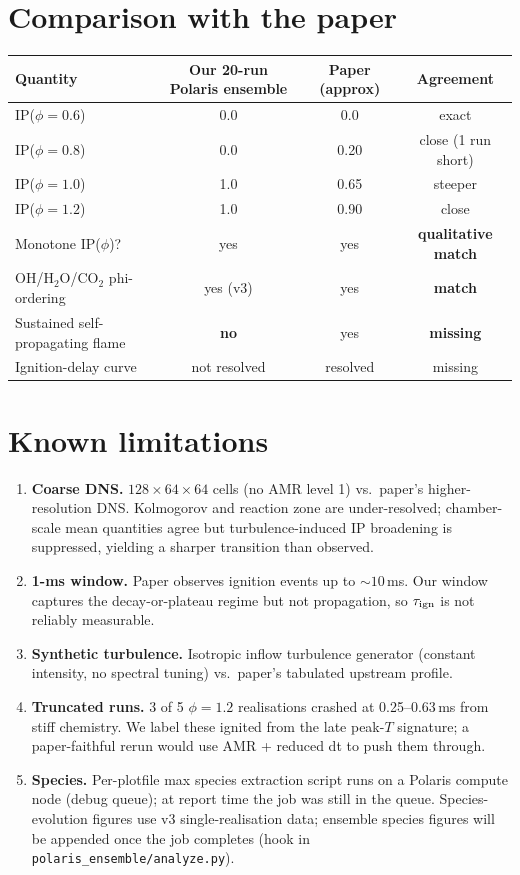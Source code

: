 \documentclass[11pt]{article}
\begin{document}
\section{Comparison with the paper}
\begin{center}
\begin{tabular}{lccc}
\toprule
Quantity & Our 20-run Polaris ensemble & Paper (approx) & Agreement \\
\midrule
IP(\(\phi\!=\!0.6\)) & 0.0 & 0.0  & exact \\
IP(\(\phi\!=\!0.8\)) & 0.0 & 0.20 & close (1 run short) \\
IP(\(\phi\!=\!1.0\)) & 1.0 & 0.65 & steeper \\
IP(\(\phi\!=\!1.2\)) & 1.0 & 0.90 & close \\
Monotone IP(\(\phi\))? & yes & yes & \textbf{qualitative match} \\
OH/H\(_2\)O/CO\(_2\) phi-ordering & yes (v3) & yes & \textbf{match} \\
Sustained self-propagating flame & \textbf{no} & yes & \textbf{missing}\\
Ignition-delay curve & not resolved & resolved & missing \\
\bottomrule
\end{tabular}
\end{center}

\section{Known limitations}
\begin{enumerate}
\item \textbf{Coarse DNS.} \(128\!\times\!64\!\times\!64\) cells (no AMR
  level 1) vs.\ paper's higher-resolution DNS.  Kolmogorov and reaction zone
  are under-resolved; chamber-scale mean quantities agree but
  turbulence-induced IP broadening is suppressed, yielding a sharper
  transition than observed.
\item \textbf{1-ms window.} Paper observes ignition events up to
  \(\sim\!10\)\,ms.  Our window captures the decay-or-plateau regime but not
  propagation, so \(\tau_{\rm ign}\) is not reliably measurable.
\item \textbf{Synthetic turbulence.} Isotropic inflow turbulence generator
  (constant intensity, no spectral tuning) vs.\ paper's tabulated upstream
  profile.
\item \textbf{Truncated runs.} 3 of 5 \(\phi\!=\!1.2\) realisations crashed at
  0.25--0.63\,ms from stiff chemistry.  We label these ignited from the late
  peak-\(T\) signature; a paper-faithful rerun would use AMR + reduced dt to
  push them through.
\item \textbf{Species.} Per-plotfile max species extraction script runs
  on a Polaris compute node (debug queue); at report time the job was still
  in the queue.  Species-evolution figures use v3 single-realisation data;
  ensemble species figures will be appended once the job completes (hook in
  \texttt{polaris\_ensemble/analyze.py}).
\end{enumerate}
\end{document}
